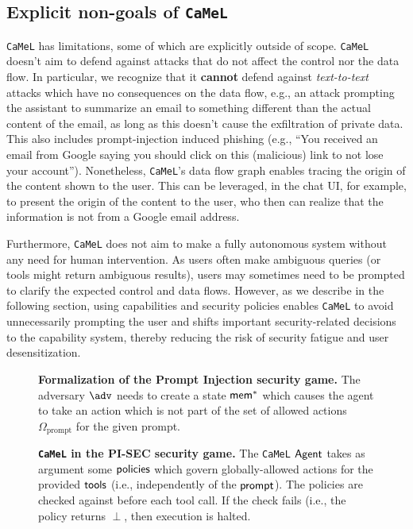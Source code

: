 \documentclass[11pt, a4paper, logo, copyright]{googledeepmind}
\newcommand{\sysname}{\texttt{CaMeL}\xspace}
\begin{document}
\subsection{Explicit non-goals of \sysname{}}
\label{sec:nongoals}
\sysname{} has limitations, some of which are explicitly outside of scope. \sysname{} doesn't aim to defend against attacks that do not affect the control nor the data flow. In particular, we recognize that it \textbf{cannot} defend against \textit{text-to-text} attacks which have no consequences on the data flow, e.g., an attack prompting the assistant to summarize an email to something different than the actual content of the email, as long as this doesn't cause the exfiltration of private data. This also includes prompt-injection induced phishing (e.g., ``You received an email from Google saying you should click on this (malicious) link to not lose your account''). Nonetheless, \sysname{}'s data flow graph enables tracing the origin of the content shown to the user. This can be leveraged, in the chat UI, for example, to present the origin of the content to the user, who then can realize that the information is not from a Google email address.

Furthermore, \sysname{} does not aim to make a fully autonomous system without any need for human intervention. As users often make ambiguous queries (or tools might return ambiguous results), users may sometimes need to be prompted to clarify the expected control and data flows. However, as we describe in the following section, using capabilities and security policies enables \sysname to avoid unnecessarily prompting the user and shifts important security-related decisions to the capability system, thereby reducing the risk of security fatigue and user desensitization.

\begin{figure}[t]
	\centering
    \small
    \begin{minipage}{\linewidth}
        
    \end{minipage}
	\caption{\textbf{Formalization of the Prompt Injection security game.} The adversary $\adv$ needs to create a state $\mathsf{mem}^*$ which causes the agent to take an action which is not part of the set of allowed actions $\Omega_\text{prompt}$ for the given prompt.}\label{fig:pi-sec-game}
\end{figure}

\begin{figure}
	\centering
	\begin{minipage}{\textwidth}
		
	\end{minipage}
	\caption{\textbf{\sysname{} in the PI-SEC security game.} The \sysname{} $\mathsf{Agent}$ takes as argument some $\mathsf{policies}$ which govern globally-allowed actions for the provided $\mathsf{tools}$ (i.e., independently of the $\mathsf{prompt}$). The policies are checked against before each tool call. If the check fails (i.e., the policy returns $\perp$, then execution is halted.}\label{fig:camel-algo}
\end{figure}
\end{document}
